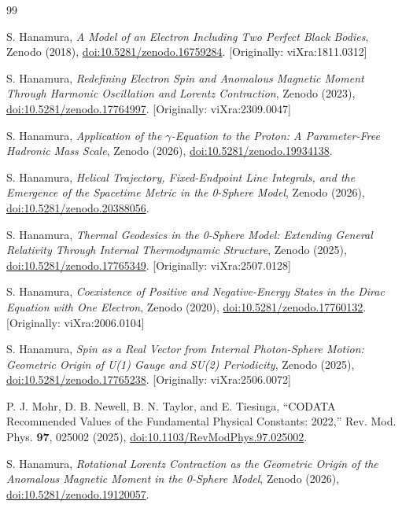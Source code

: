 \documentclass[%
 reprint, amsmath,amssymb, aps, prb, ]{revtex4-2}
\numberwithin{equation}{section}
\begin{document}
\begin{thebibliography}{99}

S. Hanamura, \emph{A Model of an Electron Including Two Perfect Black Bodies}, Zenodo (2018), \href{https://doi.org/10.5281/zenodo.16759284}{doi:10.5281/zenodo.16759284}. [Originally: viXra:1811.0312]

S. Hanamura, \emph{Redefining Electron Spin and Anomalous Magnetic Moment Through Harmonic Oscillation and Lorentz Contraction}, Zenodo (2023), \href{https://doi.org/10.5281/zenodo.17764997}{doi:10.5281/zenodo.17764997}. [Originally: viXra:2309.0047]

S. Hanamura, \emph{Application of the $\gamma$-Equation to the Proton: A Parameter-Free Hadronic Mass Scale}, Zenodo (2026), \href{https://doi.org/10.5281/zenodo.19934138}{doi:10.5281/zenodo.19934138}.

S. Hanamura, \emph{Helical Trajectory, Fixed-Endpoint Line Integrals, and the Emergence of the Spacetime Metric in the 0-Sphere Model}, Zenodo (2026), \href{https://doi.org/10.5281/zenodo.20388056}{doi:10.5281/zenodo.20388056}.

S. Hanamura, \emph{Thermal Geodesics in the 0-Sphere Model: Extending General Relativity Through Internal Thermodynamic Structure}, Zenodo (2025), \href{https://doi.org/10.5281/zenodo.17765349}{doi:10.5281/zenodo.17765349}. [Originally: viXra:2507.0128]

S. Hanamura, \emph{Coexistence of Positive and Negative-Energy States in the Dirac Equation with One Electron}, Zenodo (2020), \href{https://doi.org/10.5281/zenodo.17760132}{doi:10.5281/zenodo.17760132}. [Originally: viXra:2006.0104]

S. Hanamura, \emph{Spin as a Real Vector from Internal Photon-Sphere Motion: Geometric Origin of U(1) Gauge and SU(2) Periodicity}, Zenodo (2025), \href{https://doi.org/10.5281/zenodo.17765238}{doi:10.5281/zenodo.17765238}. [Originally: viXra:2506.0072]

P. J. Mohr, D. B. Newell, B. N. Taylor, and E. Tiesinga, ``CODATA Recommended Values of the Fundamental Physical Constants: 2022,'' Rev. Mod. Phys. \textbf{97}, 025002 (2025), \href{https://doi.org/10.1103/RevModPhys.97.025002}{doi:10.1103/RevModPhys.97.025002}.

S. Hanamura, \emph{Rotational Lorentz Contraction as the Geometric Origin of the Anomalous Magnetic Moment in the 0-Sphere Model}, Zenodo (2026), \href{https://doi.org/10.5281/zenodo.19120057}{doi:10.5281/zenodo.19120057}.


\end{thebibliography}
\end{document}
